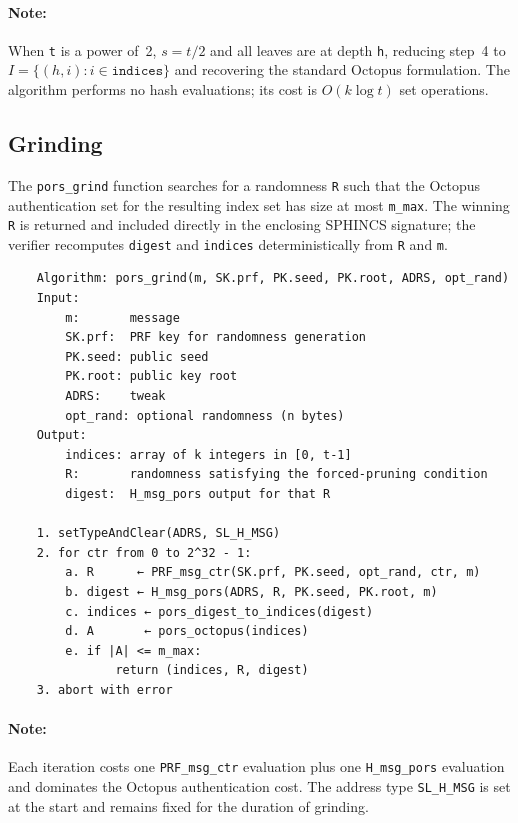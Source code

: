 \paragraph{Note:} When \texttt{t} is a power of~2, $s = t/2$ and all leaves are at depth
\texttt{h}, reducing step~4 to $I = \{(h, i) : i \in \texttt{indices}\}$ and recovering
the standard Octopus formulation. The algorithm performs no hash evaluations; its
cost is $O(k \log t)$ set operations.

\subsection{Grinding}
 
The \texttt{pors\_grind} function searches for a randomness \texttt{R} such that
the Octopus authentication set for the resulting index set has size at most
\texttt{m\_max}. The winning \texttt{R} is returned and included directly in the enclosing 
SPHINCS signature; the verifier recomputes \texttt{digest} and \texttt{indices} 
deterministically from \texttt{R} and \texttt{m}.
 
\begin{verbatim}
    Algorithm: pors_grind(m, SK.prf, PK.seed, PK.root, ADRS, opt_rand)
    Input:
        m:       message
        SK.prf:  PRF key for randomness generation
        PK.seed: public seed
        PK.root: public key root
        ADRS:    tweak
        opt_rand: optional randomness (n bytes)
    Output:
        indices: array of k integers in [0, t-1]
        R:       randomness satisfying the forced-pruning condition
        digest:  H_msg_pors output for that R
 
    1. setTypeAndClear(ADRS, SL_H_MSG)
    2. for ctr from 0 to 2^32 - 1:
        a. R      ← PRF_msg_ctr(SK.prf, PK.seed, opt_rand, ctr, m)
        b. digest ← H_msg_pors(ADRS, R, PK.seed, PK.root, m)
        c. indices ← pors_digest_to_indices(digest)
        d. A       ← pors_octopus(indices)
        e. if |A| <= m_max:
               return (indices, R, digest)
    3. abort with error
\end{verbatim}
 
\paragraph{Note:} Each iteration costs one \texttt{PRF\_msg\_ctr} evaluation plus
one \texttt{H\_msg\_pors} evaluation and dominates the Octopus authentication cost. The address type \texttt{SL\_H\_MSG} is set
at the start and remains fixed for the duration of grinding.

